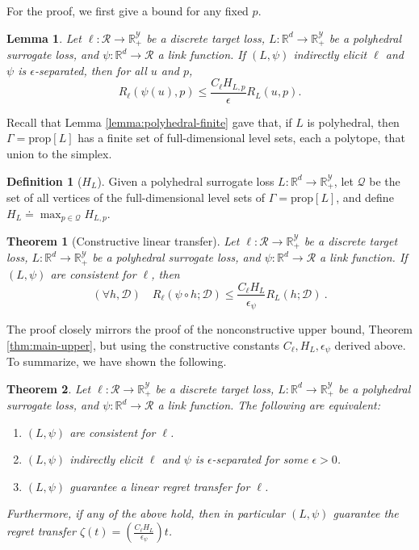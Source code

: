 \documentclass{article}
\newtheorem{theorem}{Theorem}
\newtheorem{lemma}{Lemma}
\theoremstyle{definition}\newtheorem{definition}{Definition}
\theoremstyle{definition}\newtheorem{assumption}{Assumption}
\newcommand{\reals}{\mathbb{R}}
\newcommand{\defeq}{\doteq}%
\newcommand{\prop}[1]{\mathrm{prop}[#1]}
\newcommand{\D}{\mathcal{D}}
\newcommand{\R}{\mathcal{R}}
\newcommand{\Y}{\mathcal{Y}}
\begin{document}
For the proof, we first give a bound for any fixed $p$.
\begin{lemma} \label{lemma:separated-constant-p}
  Let $\ell: \R \to \reals_+^{\Y}$ be a discrete target loss, $L: \reals^d \to \reals_+^{\Y}$ be a polyhedral surrogate loss, and $\psi: \reals^d \to \R$ a link function.
  If $(L,\psi)$ indirectly elicit $\ell$ and $\psi$ is $\epsilon$-separated, then for all $u$ and $p$,
    \[ R_{\ell}(\psi(u),p) \leq \frac{C_{\ell} H_{L,p}}{\epsilon} R_L(u,p) . \]
\end{lemma}

Recall that Lemma \ref{lemma:polyhedral-finite} gave that, if $L$ is polyhedral, then $\Gamma = \prop{L}$ has a finite set of full-dimensional level sets, each a polytope, that union to the simplex.
\begin{definition}[$H_L$]
  Given a polyhedral surrogate loss $L: \reals^d \to \reals_+^{\Y}$, let $\mathcal{Q}$ be the set of all vertices of the full-dimensional level sets of $\Gamma = \prop{L}$, and define $H_L \defeq \max_{p \in \mathcal{Q}} H_{L,p}$.
\end{definition}

\begin{theorem}[Constructive linear transfer] \label{thm:separated-constant}
  Let $\ell: \R \to \reals_+^{\Y}$ be a discrete target loss, $L: \reals^d \to \reals_+^{\Y}$ be a polyhedral surrogate loss, and $\psi: \reals^d \to \R$ a link function.
  If $(L,\psi)$ are consistent for $\ell$, then
    \[ (\forall h,\D) \quad R_{\ell}(\psi \circ h ; \D) \leq \frac{C_{\ell} H_L}{\epsilon_{\psi}} R_L(h ; \D) ~. \]
\end{theorem}
The proof closely mirrors the proof of the nonconstructive upper bound, Theorem \ref{thm:main-upper}, but using the constructive constants $C_{\ell}, H_L, \epsilon_{\psi}$ derived above.
To summarize, we have shown the following.
\begin{theorem} \label{thm:tfae}
  Let $\ell: \R \to \reals_+^{\Y}$ be a discrete target loss, $L: \reals^d \to \reals_+^{\Y}$ be a polyhedral surrogate loss, and $\psi: \reals^d \to \R$ a link function.
  The following are equivalent:
  \begin{enumerate}
    \item $(L,\psi)$ are consistent for $\ell$.
    \item $(L,\psi)$ indirectly elicit $\ell$ and $\psi$ is $\epsilon$-separated for some $\epsilon > 0$.
    \item $(L,\psi)$ guarantee a linear regret transfer for $\ell$.
  \end{enumerate}
  Furthermore, if any of the above hold, then in particular $(L,\psi)$ guarantee the regret transfer $\zeta(t) = \left(\frac{C_{\ell} H_L}{\epsilon_{\psi}}\right) t$.
\end{theorem}
\end{document}
